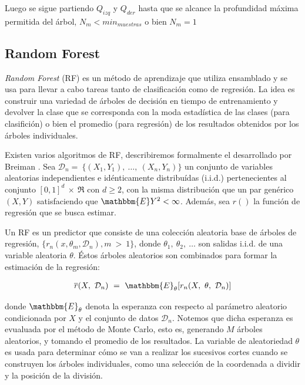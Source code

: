       Luego se sigue partiendo $Q_{izq}$ y $Q_{der}$ hasta que se alcance la profundidad
      máxima permitida del árbol, $N_{m} < min_{muestras}$ o bien $N_{m} = 1$


  \subsection{Random Forest}

    \par \textit{Random Forest} (RF) es un método de aprendizaje que utiliza ensamblado y se
      usa para llevar a cabo tareas tanto de clasificación como de regresión.
      La idea es construir una variedad de árboles de decisión en tiempo de entrenamiento
      y devolver la clase que se corresponda con la moda estadística de las clases
      (para clasifición) o bien el promedio (para regresión) de los resultados
      obtenidos por los árboles individuales.

    \par Existen varios algoritmos de RF, describiremos formalmente el desarrollado
      por Breiman \cite{random_forest}.
      Sea $\mathcal{D}_{n} = \ \{ (X_{1}, Y_{1}), \ \dots, \ (X_{n}, Y_{n})\}$
      un conjunto de variables aleatorias independientes e idénticamente distribuídas (i.i.d.)
      pertenecientes al conjunto $[0,1]^{d} \ \times \ \Re $ con $d \geq 2$,
      con la misma distribución que un par genérico $(X,Y)$ satisfaciendo que
      $\mathbbm{E}Y^{2} < \infty$. Además, sea $r()$ la función de regresión que se busca estimar.

    \par Un RF es un predictor que consiste de una colección aleatoria base
      de árboles de regresión, $\{ r_{n}(x, \theta_{m}, \mathcal{D}_{n}), m \ > \ 1 \}$, donde
      $\theta_{1},\ \theta_{2},\ \dots$ son salidas i.i.d. de una variable aleatoria
      $\theta$. Éstos árboles aleatorios son combinados para formar la estimación
      de la regresión:

      \begin{align}
        \overline{r}(X,\ \mathcal{D}_{n})\ =\ \mathbbm{E}_{\theta}[r_{n}(X,\ \theta,\ \mathcal{D}_{n})]
      \end{align}

      donde $\mathbbm{E}_{\theta}$ denota la esperanza con respecto al parámetro aleatorio
      condicionada por $X$ y el conjunto de datos $\mathcal{D}_{n}$. Notemos que
      dicha esperanza es evualuada por el método de Monte Carlo\cite{monte_carlo},
      esto es, generando $M$ árboles aleatorios, y tomando el promedio de los resultados.
      La variable de aleatoriedad $\theta$ es usada para determinar cómo se van a realizar los
      sucesivos cortes cuando se construyen los árboles individuales, como una selección
      de la coordenada a dividir y la posición de la división.

